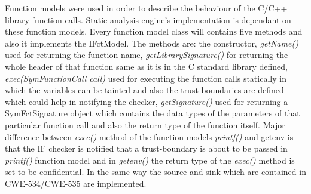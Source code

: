 Function models were used in order to describe the behaviour of the C/C++ library function calls.
Static analysis engine's implementation is dependant on these function models.
Every function model class will contains five methods and also it implements the IFctModel.
The methods are: the constructor, \emph{getName()} used for returning the function name,
\emph{getLibrarySignature()} for returning the whole header of that function 
same as it is in the C standard library defined, \emph{exec(SymFunctionCall call)}
used for executing the function calls statically
in which the variables can be tainted and also the trust
boundaries are defined which could help
in notifying the checker, \emph{getSignature()} used for returning a SymFctSignature object
which contains the data types of the parameters of that particular function call
and also the return type of the function itself.
Major difference between \emph{exec()} method of the 
function models \emph{printf()} and getenv is that the IF
checker is notified that a trust-boundary is about to be passed
in \emph{printf()} function model and in \emph{getenv()} the return type of the \emph{exec()}
method is set to be confidential. In the same way the source and sink 
which are contained in CWE-534/CWE-535 are implemented.


